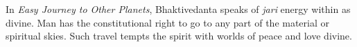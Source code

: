 

In {\it Easy Journey to Other Planets}, Bhaktivedanta speaks of {\it
jari} energy within as divine.  Man has the constitutional right to go
to any part of the material or spiritual skies.  Such travel tempts
the spirit with worlds of peace and love divine.

\bye
